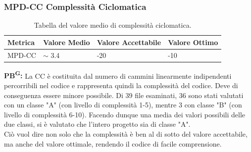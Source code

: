 \documentclass[8pt]{article}
\newcommand{\glossterm}[1]{#1\textsuperscript{G}} %
\begin{document}
\subsubsection{MPD-CC Complessità Ciclomatica}
\renewcommand{\arraystretch}{2.5}
\begin{longtable}{|>{\centering}p{3cm}|>{\centering\arraybackslash}p{3cm}|>{\centering\arraybackslash}p{3.5cm}|>{\centering\arraybackslash}p{3cm}|}
    \hline
    \rowcolor{white}
    \textbf{Metrica} & \textbf{Valore Medio} & \textbf{Valore Accettabile} & \textbf{Valore Ottimo} \\
    \hline
    \endfirsthead 
    \rowcolor{white}
    \caption{Tabella del valore medio di complessità ciclomatica.} 
    \label{table:Tabella del valore medio di complessità ciclomatica}
    \endlastfoot 
    MPD-CC & $\sim$ 3.4 & 11-20 & 1-10 \\
    \hline
\end{longtable}
\textbf{\glossterm{PB}:} La CC è costituita dal numero di cammini linearmente indipendenti percorribili nel codice e rappresenta quindi la complessità del codice. Deve di conseguenza essere minore possibile. Di 39 file esaminati, 36 sono stati valutati con un classe "A" (con livello di complessità 1-5), mentre 3 con classe "B" (con livello di complessità 6-10). Facendo dunque una media dei valori possibili delle due classi, si è valutato che l'intero progetto sia di classe "A".\\ Ciò vuol dire non solo che la complessità è ben al di sotto del valore accettabile, ma anche del valore ottimale, rendendo il codice di facile comprensione.
\end{document}
